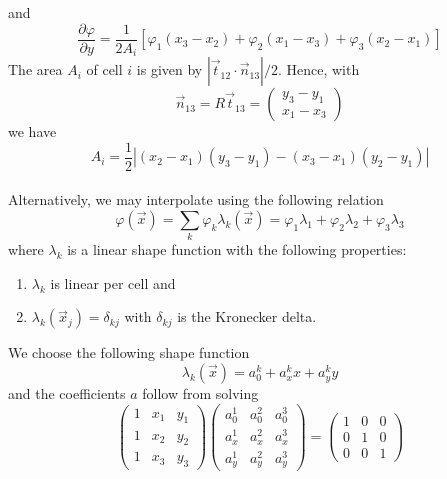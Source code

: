 \documentclass[12pt]{book}
\begin{document}
and
\begin{equation}
  \frac{\partial \varphi}{\partial y} = \frac{1}{2A_i} \left [ \varphi_1 (x_3 - x_2) + \varphi_2 (x_1 - x_3) + \varphi_3 (x_2 - x_1) \right]
  \label{eq:ygradcell}
\end{equation}
The area $A_i$ of cell $i$ is given by $|\vec{t}_{12} \cdot \vec{n}_{13}|/2$. Hence, with
\begin{equation}
  \vec{n}_{13} = R\vec{t}_{13} = \left( \begin{array}{l} y_3 - y_1 \\ x_1 - x_3 \end{array} \right)
\end{equation}
we have
\begin{equation}
  A_i = \frac{1}{2} | (x_2 - x_1)(y_3 - y_1) - (x_3 - x_1)(y_2 - y_1) |
\end{equation}
\\[2ex]
\noindent
Alternatively, we may interpolate using the following relation
\begin{equation}
  \varphi(\vec{x}) = \sum_k \varphi_k \lambda_k(\vec{x}) = \varphi_1 \lambda_1 + \varphi_2 \lambda_2 +\varphi_3 \lambda_3
\end{equation}
where $\lambda_k$ is a linear shape function with the following properties:
\begin{enumerate}
  \item $\lambda_k$ is linear per cell and
  \item $\lambda_k(\vec{x}_j) = \delta_{kj}$ with $\delta_{kj}$ is the Kronecker delta.
\end{enumerate}
We choose the following shape function
\begin{equation}
  \lambda_k(\vec{x}) = a_0^k + a_x^k x + a_y^k y
\end{equation}
and the coefficients $a$ follow from solving
\begin{equation}
  \left(
     \begin{array}{lll}
        1 & x_1 & y_1 \\
        1 & x_2 & y_2 \\
        1 & x_3 & y_3
     \end{array}
  \right)
  \left(
     \begin{array}{lll}
        a_0^1 & a_0^2 & a_0^3 \\
        a_x^1 & a_x^2 & a_x^3 \\
        a_y^1 & a_y^2 & a_y^3
     \end{array}
  \right)
  =
  \left(
     \begin{array}{lll}
        1 & 0 & 0 \\
        0 & 1 & 0 \\
        0 & 0 & 1
     \end{array}
  \right)
\end{equation}
\end{document}
